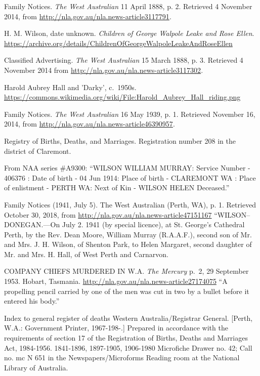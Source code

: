 \begin{thebibliography}{999}
	Family Notices. \emph{The West Australian} 11 April 1888, p. 2. Retrieved 4 November 2014,
	from \url{http://nla.gov.au/nla.news-article3117791}.

	H. M. Wilson, date unknown. \emph{Children of George Walpole Leake and Rose Ellen}.
	\url{https://archive.org/details/ChildrenOfGeorgeWalpoleLeakeAndRoseEllen}

	Classified Advertising. \emph{The West Australian} 15 March 1888, p. 3.
	Retrieved 4 November 2014 from \url{http://nla.gov.au/nla.news-article3117302}.

	Harold Aubrey Hall and 'Darky', c.\ 1950s.
	\url{https://commons.wikimedia.org/wiki/File:Harold_Aubrey_Hall_riding.png}

	Family Notices. \emph{The West Australian} 16 May 1939, p. 1. Retrieved November 16, 2014, from \url{http://nla.gov.au/nla.news-article46390957}.

	Registry of Births, Deaths, and Marriages. Registration number 208 in the district of Claremont.

	From NAA series \#A9300: ``WILSON WILLIAM MURRAY: Service Number - 406376
	: Date of birth - 04 Jun 1914: Place of birth - CLAREMONT WA
	: Place of enlistment - PERTH WA: Next of Kin - WILSON HELEN Deceased.''

    Family Notices (1941, July 5). The West Australian (Perth, WA), p. 1.
    Retrieved October 30, 2018, from \url{http://nla.gov.au/nla.news-article47151167}
    ``WILSON--DONEGAN.---On July 2. 1941 (by special licence), at St. George's Cathedral Perth, by the Rev. Dean Moore,
    William Murray (R.A.A.F.), second son of Mr. and Mrs. J. H. Wilson, of Shenton Park,
    to Helen Margaret, second daughter of Mr. and Mrs. H. Hall, of West Perth and Carnarvon.

	 COMPANY CHIEFS MURDERED IN W.A. \emph{The Mercury} p.\ 2, 29 September 1953. Hobart, Tasmania.
	 \url{http://nla.gov.au/nla.news-article27174075}
	 ``A propelling pencil carried by one of the men was cut in two by a bullet before it entered his body.''

	Index to general register of deaths Western Australia/Registrar General. [Perth, W.A.: Government Printer, 1967-198-.] Prepared in accordance with the requirements of section 17 of the Registration of Births, Deaths and Marriages Act, 1984-1956. 1841-1896, 1897-1905, 1906-1980 Microfiche Drawer no. 42; Call no. mc N 651 in the Newspapers/Microforms Reading room at the National Library of Australia.


\end{thebibliography}
